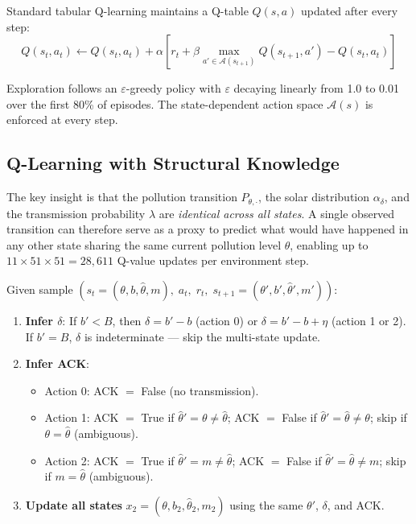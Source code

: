 \documentclass[12pt, a4paper]{article}
\begin{document}
Standard tabular Q-learning maintains a Q-table $Q(s, a)$ updated after every step:
\[
Q(s_t, a_t) \leftarrow Q(s_t, a_t) + \alpha \left[ r_t + \beta \max_{a' \in \mathcal{A}(s_{t+1})} Q(s_{t+1}, a') - Q(s_t, a_t) \right]
\]

Exploration follows an $\varepsilon$-greedy policy with $\varepsilon$ decaying linearly from 1.0 to 0.01 over the first 80\% of episodes. The state-dependent action space $\mathcal{A}(s)$ is enforced at every step.

\subsection{Q-Learning with Structural Knowledge}

The key insight is that the pollution transition $P_{\theta,\cdot}$, the solar distribution $\alpha_\delta$, and the transmission probability $\lambda$ are \emph{identical across all states}. A single observed transition can therefore serve as a proxy to predict what would have happened in any other state sharing the same current pollution level $\theta$, enabling up to $11 \times 51 \times 51 = 28{,}611$ Q-value updates per environment step.

Given sample $(s_t = (\theta, b, \hat{\theta}, m),\; a_t,\; r_t,\; s_{t+1} = (\theta', b', \hat{\theta}', m'))$:

\begin{enumerate}
  \item \textbf{Infer $\delta$}: If $b' < B$, then $\delta = b'-b$ (action 0) or $\delta = b'-b+\eta$ (action 1 or 2). If $b'=B$, $\delta$ is indeterminate — skip the multi-state update.

  \item \textbf{Infer ACK}:
  \begin{itemize}
    \item Action 0: ACK $=$ False (no transmission).
    \item Action 1: ACK $=$ True if $\hat{\theta}' = \theta \neq \hat{\theta}$;\; ACK $=$ False if $\hat{\theta}' = \hat{\theta} \neq \theta$;\; skip if $\theta = \hat{\theta}$ (ambiguous).
    \item Action 2: ACK $=$ True if $\hat{\theta}' = m \neq \hat{\theta}$;\; ACK $=$ False if $\hat{\theta}' = \hat{\theta} \neq m$;\; skip if $m = \hat{\theta}$ (ambiguous).
  \end{itemize}

  \item \textbf{Update all states} $x_2 = (\theta, b_2, \hat{\theta}_2, m_2)$ using the same $\theta'$, $\delta$, and ACK.
\end{enumerate}
\end{document}
